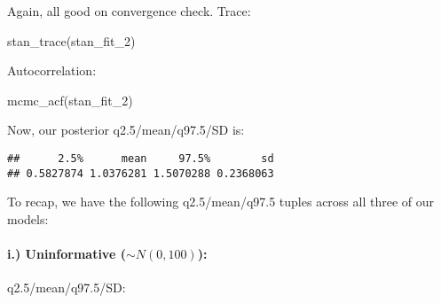 \documentclass[
]{article}
\newenvironment{Shaded}{\begin{snugshade}}{\end{snugshade}}
\newcommand{\DecValTok}[1]{\textcolor[rgb]{0.00,0.00,0.81}{#1}}
\newcommand{\FunctionTok}[1]{\textcolor[rgb]{0.00,0.00,0.00}{#1}}
\newcommand{\NormalTok}[1]{#1}
\newcommand{\SpecialCharTok}[1]{\textcolor[rgb]{0.00,0.00,0.00}{#1}}
\begin{document}
Again, all good on convergence check. Trace:

\begin{Shaded}
\begin{Highlighting}[]
\FunctionTok{stan\_trace}\NormalTok{(stan\_fit\_2)}
\end{Highlighting}
\end{Shaded}

Autocorrelation:

\begin{Shaded}
\begin{Highlighting}[]
\FunctionTok{mcmc\_acf}\NormalTok{(stan\_fit\_2)}
\end{Highlighting}
\end{Shaded}

Now, our posterior q2.5/mean/q97.5/SD is:

\begin{Shaded}
\end{Shaded}

\begin{verbatim}
##      2.5%      mean     97.5%        sd 
## 0.5827874 1.0376281 1.5070288 0.2368063
\end{verbatim}

To recap, we have the following q2.5/mean/q97.5 tuples across all three
of our models:

\hypertarget{i.-uninformative-sim-n0-100}{%
\paragraph{\texorpdfstring{i.) Uninformative
(\(\sim N(0, 100)\)):}{i.) Uninformative (\textbackslash sim N(0, 100)):}}\label{i.-uninformative-sim-n0-100}}

q2.5/mean/q97.5/SD:

\begin{Shaded}
\end{Shaded}
\end{document}
